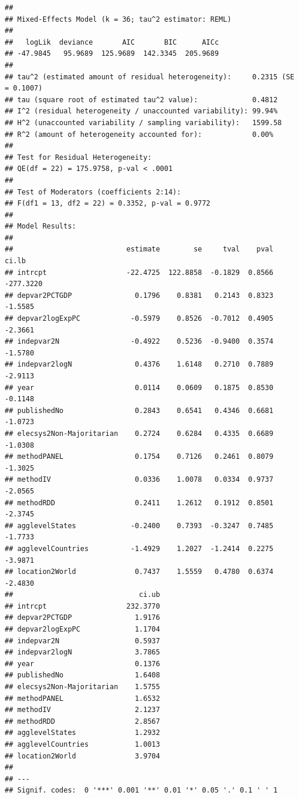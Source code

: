 \documentclass[
]{article}
\begin{document}
\begin{verbatim}
## 
## Mixed-Effects Model (k = 36; tau^2 estimator: REML)
## 
##   logLik  deviance       AIC       BIC      AICc 
## -47.9845   95.9689  125.9689  142.3345  205.9689   
## 
## tau^2 (estimated amount of residual heterogeneity):     0.2315 (SE = 0.1007)
## tau (square root of estimated tau^2 value):             0.4812
## I^2 (residual heterogeneity / unaccounted variability): 99.94%
## H^2 (unaccounted variability / sampling variability):   1599.58
## R^2 (amount of heterogeneity accounted for):            0.00%
## 
## Test for Residual Heterogeneity:
## QE(df = 22) = 175.9758, p-val < .0001
## 
## Test of Moderators (coefficients 2:14):
## F(df1 = 13, df2 = 22) = 0.3352, p-val = 0.9772
## 
## Model Results:
## 
##                           estimate        se     tval    pval      ci.lb 
## intrcpt                   -22.4725  122.8858  -0.1829  0.8566  -277.3220 
## depvar2PCTGDP               0.1796    0.8381   0.2143  0.8323    -1.5585 
## depvar2logExpPC            -0.5979    0.8526  -0.7012  0.4905    -2.3661 
## indepvar2N                 -0.4922    0.5236  -0.9400  0.3574    -1.5780 
## indepvar2logN               0.4376    1.6148   0.2710  0.7889    -2.9113 
## year                        0.0114    0.0609   0.1875  0.8530    -0.1148 
## publishedNo                 0.2843    0.6541   0.4346  0.6681    -1.0723 
## elecsys2Non-Majoritarian    0.2724    0.6284   0.4335  0.6689    -1.0308 
## methodPANEL                 0.1754    0.7126   0.2461  0.8079    -1.3025 
## methodIV                    0.0336    1.0078   0.0334  0.9737    -2.0565 
## methodRDD                   0.2411    1.2612   0.1912  0.8501    -2.3745 
## agglevelStates             -0.2400    0.7393  -0.3247  0.7485    -1.7733 
## agglevelCountries          -1.4929    1.2027  -1.2414  0.2275    -3.9871 
## location2World              0.7437    1.5559   0.4780  0.6374    -2.4830 
##                              ci.ub 
## intrcpt                   232.3770    
## depvar2PCTGDP               1.9176    
## depvar2logExpPC             1.1704    
## indepvar2N                  0.5937    
## indepvar2logN               3.7865    
## year                        0.1376    
## publishedNo                 1.6408    
## elecsys2Non-Majoritarian    1.5755    
## methodPANEL                 1.6532    
## methodIV                    2.1237    
## methodRDD                   2.8567    
## agglevelStates              1.2932    
## agglevelCountries           1.0013    
## location2World              3.9704    
## 
## ---
## Signif. codes:  0 '***' 0.001 '**' 0.01 '*' 0.05 '.' 0.1 ' ' 1
\end{verbatim}
\end{document}
